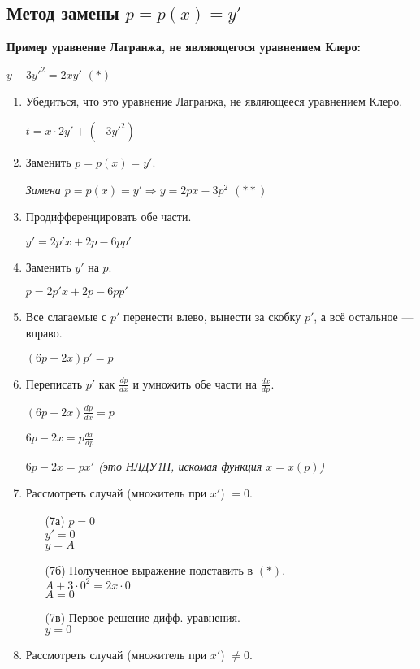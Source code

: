 \documentclass[10pt, a4paper]{article}
\begin{document}
\subsection{Метод замены $p = p(x) = y'$}
\textbf{Пример уравнение Лагранжа, не являющегося уравнением Клеро:}
\par $y + 3y'^2 = 2xy'$ $(*)$
\begin{enumerate}
    \item Убедиться, что это уравнение Лагранжа, не являющееся уравнением Клеро.
        \par $t = x \cdot 2y' + (-3y'^2)$
    \item Заменить $p = p(x) = y'$.
        \par\textit{Замена $p = p(x) = y' \Rightarrow y = 2px - 3p^2$ $(**)$}
    \item Продифференцировать обе части.
        \par $y' = 2p'x + 2p - 6pp'$
    \item Заменить $y'$ на $p$.
        \par $p = 2p'x + 2p - 6pp'$
    \item Все слагаемые с $p'$ перенести влево, вынести за скобку $p'$, а всё остальное — вправо.
        \par $(6p - 2x)p' = p$
    \item Переписать $p'$ как $\frac{dp}{dx}$ и умножить обе части на $\frac{dx}{dp}$.
        \par $(6p - 2x)\frac{dp}{dx} = p$
        \par $6p - 2x = p\frac{dx}{dp}$
        \par\textit{$6p - 2x = px'$ (это НЛДУ1П, искомая функция $x = x(p)$)}
    \item Рассмотреть случай (множитель при $x'$) $= 0$.
        \begin{enumerate}
            \item[(7а)] $p = 0$ \\
                  $y' = 0$ \\
                  $y = A$
            \item[(7б)] Полученное выражение подставить в $(*)$. \\
                  $A + 3 \cdot 0^2 = 2x \cdot 0$ \\
                  $A = 0$
            \item[(7в)] Первое решение дифф. уравнения. \\
                  $y = 0$
        \end{enumerate}
    \item Рассмотреть случай (множитель при $x'$) $\neq 0$.

\end{enumerate}
\end{document}
